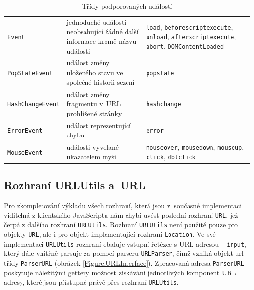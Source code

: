 \begin{table}[H]
  \begin{center} 
    \begin{tabular}{|l|p{5cm}|P{6cm}|} \hline
     &  &  \\ \hline
    \texttt{Event} & jednoduché události neobsahující žádné další informace kromě názvu události & \texttt{load}, \texttt{beforescriptexecute}, \mbox{\texttt{unload}}, \texttt{afterscriptexecute}, \texttt{abort}, \texttt{DOMContentLoaded} \\ \hline
    \texttt{PopStateEvent} & událost změny uloženého stavu ve společné historii sezení & \texttt{popstate} \\ \hline
    \texttt{HashChangeEvent} & událost změny fragmentu v~URL prohlížené stránky & \texttt{hashchange} \\ \hline
    \texttt{ErrorEvent} & událost reprezentující chybu & \texttt{error} \\ \hline
    \texttt{MouseEvent} & události vyvolané ukazatelem myši & \texttt{mouseover}, \texttt{mousedown}, \texttt{mouseup}, \texttt{click}, \texttt{dblclick} \\ \hline
    \end{tabular}
    \caption{Třídy podporovaných událostí}
    \label{Table.SupportedEvents}
  \end{center}
\end{table}

\subsection{Rozhraní URLUtils a~URL}
\label{Chapter.Implementation.URLUtilsInterface}

Pro zkompletování výkladu všech rozhraní, která jsou v~současné implementaci viditelná z klientského JavaScriptu nám chybí uvést poslední rozhraní \texttt{URL}, jež čerpá z dalšího rozhraní \texttt{URLUtils}. Rozhraní \texttt{URLUtils} není použité pouze pro objekty \texttt{URL}, ale i pro objekt implementující rozhraní \texttt{Location}. Ve své implementaci \texttt{URLUtils} rozhraní obaluje vstupní řetězec s URL adresou -- \texttt{input}, který dále vnitřně parsuje za pomocí parseru \texttt{URLParser}, čímž vzniká objekt url třídy \texttt{ParserURL} (obrázek \ref{Figure.URLInterface}). Zpracovaná adresa \texttt{ParserURL} poskytuje náležitými gettery možnost získávání jednotlivých komponent URL adresy, které jsou přístupné právě přes rozhraní \texttt{URLUtils}. 

